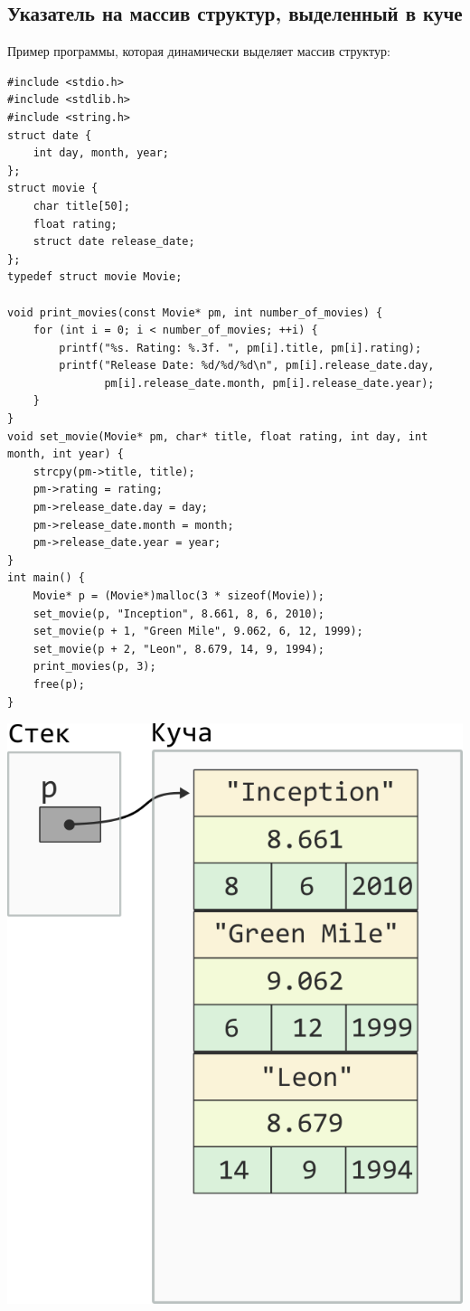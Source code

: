 \documentclass{article}
\begin{document}
\newpage


\subsection*{Указатель на массив структур, выделенный в куче}
Пример программы, которая динамически выделяет массив структур:
\begin{lstlisting}
#include <stdio.h>
#include <stdlib.h>
#include <string.h>
struct date {
    int day, month, year;
};
struct movie {
    char title[50];
    float rating;
    struct date release_date;
};
typedef struct movie Movie;

void print_movies(const Movie* pm, int number_of_movies) {
    for (int i = 0; i < number_of_movies; ++i) {
        printf("%s. Rating: %.3f. ", pm[i].title, pm[i].rating);
        printf("Release Date: %d/%d/%d\n", pm[i].release_date.day,
               pm[i].release_date.month, pm[i].release_date.year);
    }
}
void set_movie(Movie* pm, char* title, float rating, int day, int month, int year) {
    strcpy(pm->title, title);
    pm->rating = rating;
    pm->release_date.day = day;
    pm->release_date.month = month;
    pm->release_date.year = year;
}
int main() {
    Movie* p = (Movie*)malloc(3 * sizeof(Movie));
    set_movie(p, "Inception", 8.661, 8, 6, 2010);
    set_movie(p + 1, "Green Mile", 9.062, 6, 12, 1999);
    set_movie(p + 2, "Leon", 8.679, 14, 9, 1994);
    print_movies(p, 3);
    free(p);
}
\end{lstlisting}
\vspace{-130ex}
\begin{center}
\hfill 
\includegraphics[scale=0.9]{../images/pointer_schemes/pointer_to_array_of_struct_movie_2.png}
\end{center}
\end{document}
